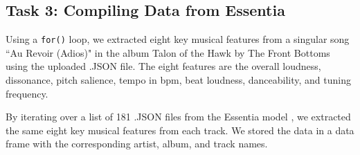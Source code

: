 \documentclass{article}\usepackage[]{graphicx}\usepackage[]{xcolor}
\begin{document}
\begin{multicols}{2}
% 
% 
% 
% 

\subsection{Task 3: Compiling Data from Essentia}

Using a \texttt{for()} loop, we extracted eight key musical features from a singular song ``Au Revoir (Adios)" in the album Talon of the Hawk by The Front Bottoms using the uploaded .JSON file. The eight features are the overall loudness, dissonance, pitch salience, tempo in bpm, beat loudness, danceability, and tuning frequency.

By iterating over a list of 181 .JSON files from the Essentia model
\citep{Bogdanov}, we extracted the same eight key musical features from each track. We stored the data in a data frame with the corresponding artist, album, and track names. 


\end{multicols}
\end{document}
